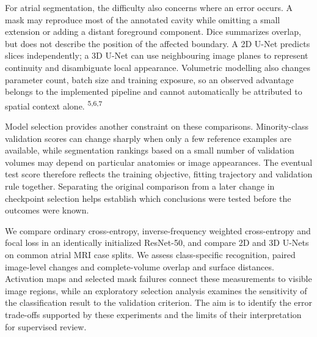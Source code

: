 \documentclass[11pt,a4paper]{article}
\begin{document}
For atrial segmentation, the difficulty also concerns where an error occurs. A mask may reproduce most of the annotated cavity while omitting a small extension or adding a distant foreground component. Dice summarizes overlap, but does not describe the position of the affected boundary. A 2D U-Net predicts slices independently; a 3D U-Net can use neighbouring image planes to represent continuity and disambiguate local appearance. Volumetric modelling also changes parameter count, batch size and training exposure, so an observed advantage belongs to the implemented pipeline and cannot automatically be attributed to spatial context alone. \textsuperscript{5,6,7}



Model selection provides another constraint on these comparisons. Minority-class validation scores can change sharply when only a few reference examples are available, while segmentation rankings based on a small number of validation volumes may depend on particular anatomies or image appearances. The eventual test score therefore reflects the training objective, fitting trajectory and validation rule together. Separating the original comparison from a later change in checkpoint selection helps establish which conclusions were tested before the outcomes were known.



We compare ordinary cross-entropy, inverse-frequency weighted cross-entropy and focal loss in an identically initialized ResNet-50, and compare 2D and 3D U-Nets on common atrial MRI case splits. We assess class-specific recognition, paired image-level changes and complete-volume overlap and surface distances. Activation maps and selected mask failures connect these measurements to visible image regions, while an exploratory selection analysis examines the sensitivity of the classification result to the validation criterion. The aim is to identify the error trade-offs supported by these experiments and the limits of their interpretation for supervised review.
\end{document}
